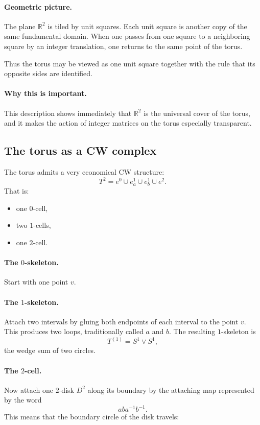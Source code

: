 \documentclass[12pt,a4paper]{article}
\theoremstyle{notespace}
\begin{document}
\paragraph{Geometric picture.}
The plane \(\mathbb R^2\) is tiled by unit squares. Each unit square is another copy of the same fundamental domain. When one passes from one square to a neighboring square by an integer translation, one returns to the same point of the torus.

Thus the torus may be viewed as one unit square together with the rule that its opposite sides are identified.

\paragraph{Why this is important.}
This description shows immediately that \(\mathbb R^2\) is the universal cover of the torus, and it makes the action of integer matrices on the torus especially transparent.

\subsection{The torus as a CW complex}

The torus admits a very economical CW structure:
\[
T^2=e^0\cup e^1_a\cup e^1_b\cup e^2.
\]
That is:

\begin{itemize}
	\item one \(0\)-cell,
	\item two \(1\)-cells,
	\item one \(2\)-cell.
\end{itemize}

\paragraph{The \(0\)-skeleton.}
Start with one point \(v\).

\paragraph{The \(1\)-skeleton.}
Attach two intervals by gluing both endpoints of each interval to the point \(v\). This produces two loops, traditionally called \(a\) and \(b\). The resulting \(1\)-skeleton is
\[
T^{(1)}=S^1\vee S^1,
\]
the wedge sum of two circles.

\paragraph{The \(2\)-cell.}
Now attach one \(2\)-disk \(D^2\) along its boundary by the attaching map represented by the word
\[
aba^{-1}b^{-1}.
\]
This means that the boundary circle of the disk travels:
\end{document}
